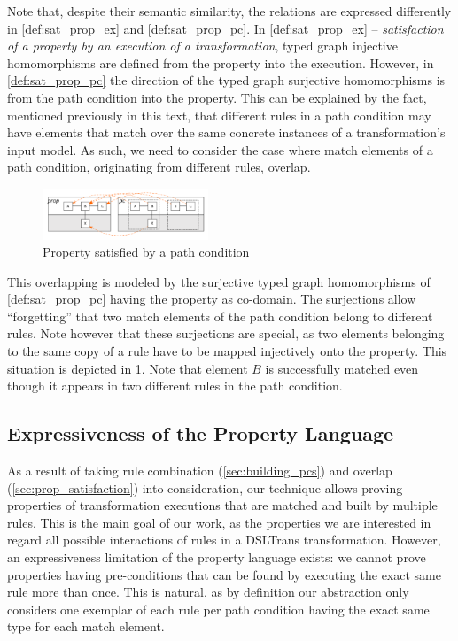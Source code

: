 Note that, despite their semantic similarity, the relations are expressed differently in \cref{def:sat_prop_ex} and \cref{def:sat_prop_pc}. In \cref{def:sat_prop_ex} -- \emph{satisfaction of a property by an execution of a transformation}, typed graph injective homomorphisms are defined from the property into the execution. However, in \cref{def:sat_prop_pc} the direction of the typed graph surjective homomorphisms is from the path condition into the property. This can be explained by the fact, mentioned previously in this text, that different rules in a path condition may have elements that match over the same concrete instances of a transformation's input model. As such, we need to consider the case where match elements of a path condition, originating from different rules, overlap. 

\begin{figure}[htb]
 \centering
                \includegraphics[width=0.44\textwidth]{./figures/property_proving/prop_pc.pdf}
                \caption{Property satisfied by a path condition}
                \label{fig:prop_pc}
\end{figure}

This overlapping is modeled by the surjective typed graph homomorphisms of \cref{def:sat_prop_pc} having the property as co-domain. The surjections allow ``forgetting'' that two match elements of the path condition belong to different rules. Note however that these surjections are special, as two elements belonging to the same copy of a rule have to be mapped injectively onto the property. This situation is depicted in \cref{fig:prop_pc}. Note that element $B$ is successfully matched even though it appears in two different rules in the path condition. 



\subsection{Expressiveness of the Property Language}
\label{subsec:expressiveness_prop}

As a result of taking rule combination (\cref{sec:building_pcs}) and overlap (\cref{sec:prop_satisfaction}) into consideration, our technique allows proving properties of transformation executions that are matched and built by multiple rules. This is the main goal of our work, as the properties we are interested in regard all possible interactions of rules in a DSLTrans transformation. However, an expressiveness limitation of the property language exists: we cannot prove properties having pre-conditions that can be found by executing the exact same rule more than once. This is natural, as by definition our abstraction only considers one exemplar of each rule per path condition having the exact same type for each match element. 

